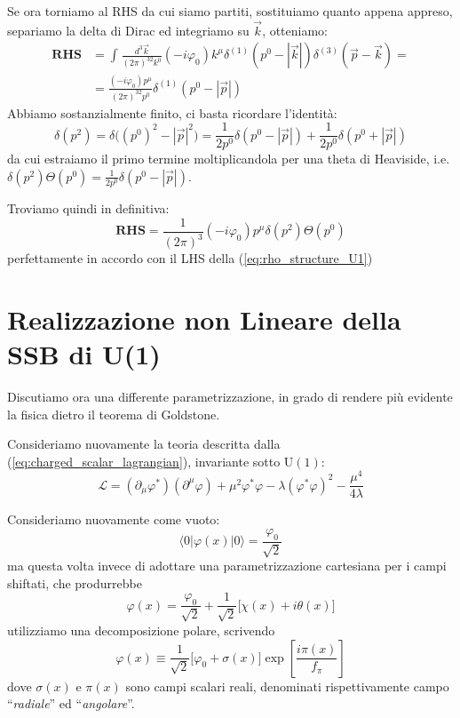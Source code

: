 \documentclass[../main.tex]{subfiles}
\begin{document}
\begin{exercise}
    Se ora torniamo al RHS da cui siamo partiti, sostituiamo quanto appena appreso, separiamo la delta di Dirac ed integriamo su $\Vec{k}$, otteniamo:
    \begin{align*}
        \textbf{RHS} &= \int_{}\frac{d^3\Vec{k}}{(2\pi)^32k^0}(-i\varphi_0)k^\mu \delta^{(1)}(p^0-|\Vec{k}|) \delta^{(3)}(\Vec{p}-\Vec{k}) = \\
        &= \frac{(-i\varphi_0)p^\mu}{(2\pi)^32p^0} \delta^{(1)}(p^0-|\Vec{p}|)
    \end{align*}
    Abbiamo sostanzialmente finito, ci basta ricordare l'identità:
    \[
    \delta(p^2) = \delta\big((p^0)^2-|\Vec{p}|^2\big) =\frac{1}{2p^0}\delta(p^0-|\Vec{p}|) + \frac{1}{2p^0}\delta(p^0+|\Vec{p}|)
    \]
    da cui estraiamo il primo termine moltiplicandola per una theta di Heaviside, i.e. $\delta(p^2)\Theta(p^0) = \frac{1}{2p^0}\delta(p^0-|\Vec{p}|)$. 

    Troviamo quindi in definitiva:
    \begin{equation}
        \boxed{\textbf{RHS} = \frac{1}{(2\pi)^3} (-i\varphi_0)p^\mu\delta(p^2)\Theta(p^0)}
        \label{eq:RHS_rhomu}
    \end{equation}
    perfettamente in accordo con il LHS della (\ref{eq:rho_structure_U1})
\end{exercise}

\section{Realizzazione non Lineare della SSB di U(1)}
\label{sec:non_linear_U1_SSB}
Discutiamo ora una differente parametrizzazione, in grado di rendere più evidente la fisica dietro il teorema di Goldstone. 

Consideriamo nuovamente la teoria descritta dalla (\ref{eq:charged_scalar_lagrangian}), invariante sotto $\textrm{U}(1)$:
\[
\mathscr{L} = (\partial_\mu\varphi^\ast)(\partial^\mu\varphi) +\mu^2\varphi^\ast\varphi - \lambda(\varphi^\ast\varphi)^2 - \frac{\mu^4}{4\lambda}
\]

Consideriamo nuovamente come vuoto:
\[
\langle 0|\varphi(x)|0\rangle = \frac{\varphi_0}{\sqrt{2}}
\]
ma questa volta invece di adottare una parametrizzazione cartesiana per i campi shiftati, che produrrebbe
\[
\varphi(x) = \frac{\varphi_0}{\sqrt{2}} + \frac{1}{\sqrt{2}}\big[\chi(x) + i \theta(x)\big]
\]
utilizziamo una decomposizione polare, scrivendo
\begin{equation}
    \boxed{\varphi(x) \equiv \frac{1}{\sqrt{2}} \big[\varphi_0 + \sigma(x)\big]\exp[\frac{i\pi(x)}{f_\pi}]}
    \label{eq:shifted_field_polar}
\end{equation}
dove $\sigma(x)$ e $\pi(x)$ sono campi scalari reali, denominati rispettivamente campo “\textit{radiale}” ed “\textit{angolare}”.
\end{document}
